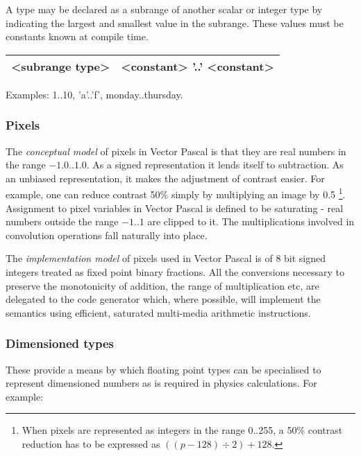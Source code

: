 A type may be declared as a subrange of another scalar
or integer type by indicating the largest and smallest value
in the subrange. These values must be constants known at compile time.

\vspace{0.3cm}
{\centering \begin{tabular}{|c|c|}
\hline 
<subrange type>&
<constant> '..' <constant>\\
\hline 
\end{tabular}\par}
\vspace{0.3cm}

Examples: 1..10, 'a'..'f', monday..thursday.


\subsubsection{Pixels}

The \emph{conceptual model} of pixels in Vector Pascal is that they are real
numbers in the range $ -1.0..1.0 $. As a signed representation it lends itself
to subtraction. As an unbiased representation, it makes the adjustment of contrast
easier. For example, one can reduce contrast 50\% simply by multiplying an image
by 0.5 \footnote{%
When pixels are represented as integers in the range 0..255, a 50\% contrast
reduction has to be expressed as $ ((p-128)\div 2)+128 $.
}. Assignment to pixel variables in Vector Pascal is defined to be saturating
- real numbers outside the range $ -1..1 $ are clipped to it. The multiplications
involved in convolution operations fall naturally into place. 

The \emph{implementation model} of pixels used in Vector Pascal is of 8 bit
signed integers treated as fixed point binary fractions. All the conversions
necessary to preserve the monotonicity of addition, the range of multiplication
etc, are delegated to the code generator which, where possible, will implement
the semantics using efficient, saturated multi-media arithmetic instructions. 


\subsubsection{Dimensioned types}

These provide a means by which floating point types can be specialised to represent
dimensioned numbers as is required in physics calculations. For example:

